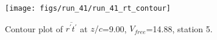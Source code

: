 \begin{figure}[H]
\centering
\texttt{[image: figs/run\_41/run\_41\_rt\_contour]}
\caption{Contour plot of $\overline{r^\prime t^\prime}$ at $z/c$=9.00, $V_{free}$=14.88, station 5.}
\label{fig:run_41_rt_contour}
\end{figure}



